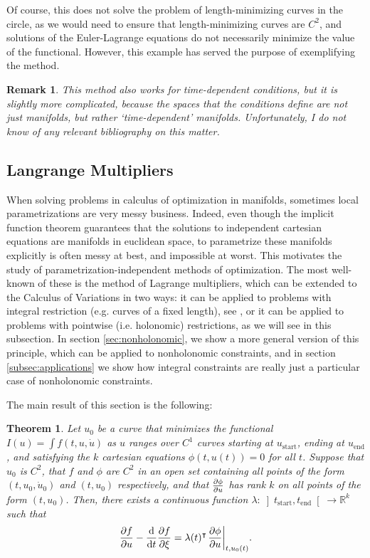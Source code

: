 \documentclass{article}
\newtheorem{theorem}{Theorem}
\theoremstyle{plain}
\newtheorem{remark}{Remark}
\theoremstyle{nonumberplain}
\newcommand{\R}{\mathbb{R}}
\newcommand{\tr}{\intercal}
\newcommand{\tstart}{\mathrm{start}}
\newcommand{\tend}{\mathrm{end}}
\DeclarePairedDelimiter\eval{.}{\rvert}
\begin{document}
Of course, this does not solve the problem of length-minimizing curves in the circle, as we would need to ensure that length-minimizing curves are $C^2$, and solutions of the Euler-Lagrange equations do not necessarily minimize the value of the functional. However, this example has served the purpose of exemplifying the method.

\begin{remark}
This method also works for time-dependent conditions, but it is slightly more complicated, because the spaces that the conditions define are not just manifolds, but rather `time-dependent' manifolds. Unfortunately, I do not know of any relevant bibliography on this matter.
\end{remark}

\subsection{Langrange Multipliers}

When solving problems in calculus of optimization in manifolds, sometimes local parametrizations are very messy business. Indeed, even though the implicit function theorem guarantees that the solutions to independent cartesian equations are manifolds in euclidean space, to parametrize these manifolds explicitly is often messy at best, and impossible at worst. This motivates the study of parametrization-independent methods of optimization. The most well-known of these is the method of Lagrange multipliers, which can be extended to the Calculus of Variations in two ways: it can be applied to problems with integral restriction (e.g. curves of a fixed length), see \cite[\S 12.1]{gelfandfomin}, or it can be applied to problems with pointwise (i.e. holonomic) restrictions, as we will see in this subsection. In section \ref{sec:nonholonomic}, we show a more general version of this principle, which can be applied to nonholonomic constraints, and in section \ref{subsec:applications} we show how integral constraints are really just a particular case of nonholonomic constraints. %

The main result of this section is the following:

\begin{theorem}\label{lagrangeholonomic}
Let $u_0$ be a curve that minimizes the functional $I(u) = \int f(t,u,\dot u)$ as $u$ ranges over $C^1$ curves starting at $u_\tstart$, ending at $u_\tend$, and satisfying the $k$ cartesian equations $\phi(t,u(t)) = 0$ for all $t$. Suppose that $u_0$ is $C^2$, that $f$ and $\phi$ are $C^2$ in an open set containing all points of the form $(t,u_0,\dot u_0)$ and $(t,u_0)$ respectively, and that $\diffp \phi u$ has rank $k$ on all points of the form $(t,u_0)$. Then, there exists a continuous function $\lambda \colon \left]t_\tstart, t_\tend\right[ \to \R^k$ such that
\begin{equation}\label{eq:lagrangeholonomic}
\diffp f u - \diff*{\diffp f \xi}t = \lambda(t)^\tr \eval*{\diffp{\phi}{u}}_{t,u_0(t)}.
\end{equation}
\end{theorem}
\end{document}
